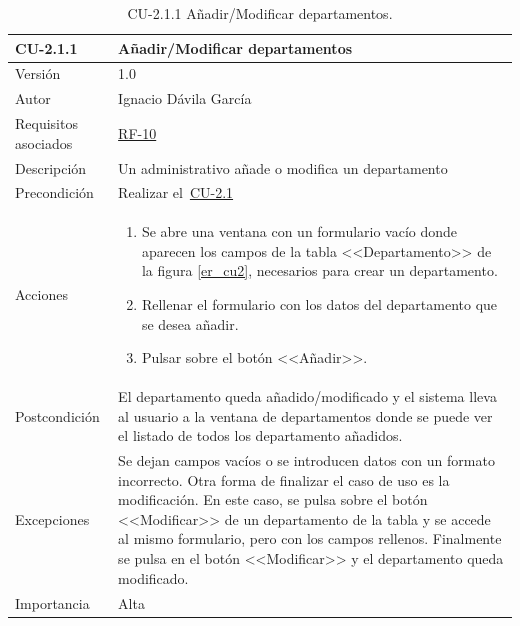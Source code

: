\begin{table}[p]
	\centering
	\begin{tabularx}{\linewidth}{ p{} p{} }
		\toprule
		\textbf{CU-2.1.1}    & \textbf{Añadir/Modificar departamentos}\\
		\toprule
		{\small Versión}              & 1.0    \\
		{\small Autor}                & Ignacio Dávila García \\
		{\small Requisitos asociados} & \hyperref[itm:RF10]{RF-10} \\
		{\small Descripción}          & Un administrativo añade o modifica un departamento \\
		{\small Precondición}         & Realizar el~\hyperref[table:CU-2_1]{CU-2.1} \\
		{\small Acciones}             &
		\begin{enumerate}
			\def\labelenumi{\arabic{enumi}.}
			\tightlist
			\item Se abre una ventana con un formulario vacío donde aparecen los campos de la tabla <<Departamento>> de la figura \ref{er_cu2}, necesarios para crear un departamento.
			\item Rellenar el formulario con los datos del departamento que se desea añadir.
			\item Pulsar sobre el botón <<Añadir>>.
		\end{enumerate}\\
		{\small Postcondición}        & El departamento queda añadido/modificado y el sistema lleva al usuario a la ventana de departamentos donde se puede ver el listado de todos los departamento añadidos. \\
		{\small Excepciones}          & Se dejan campos vacíos o se introducen datos con un formato incorrecto. Otra forma de finalizar el caso de uso es la modificación. En este caso, se pulsa sobre el botón <<Modificar>> de un departamento de la tabla y se accede al mismo formulario, pero con los campos rellenos. Finalmente se pulsa en el botón <<Modificar>> y el departamento queda modificado. \\
		{\small Importancia}          & Alta \\
		\bottomrule
	\end{tabularx}
	\caption{CU-2.1.1 Añadir/Modificar departamentos.}\label{table:CU-2_1_1}
\end{table}
\FloatBarrier

